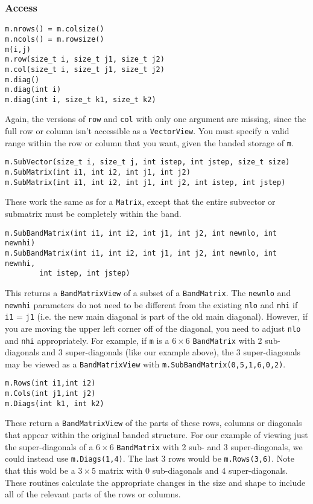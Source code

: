 \documentclass[twoside,letterpaper,11pt]{article}
\renewcommand{\tt}[1]{{\texttt {#1}}}
\begin{document}
\subsubsection{Access}

\begin{verbatim}
m.nrows() = m.colsize()
m.ncols() = m.rowsize()
m(i,j)
m.row(size_t i, size_t j1, size_t j2)
m.col(size_t i, size_t j1, size_t j2)
m.diag()
m.diag(int i)
m.diag(int i, size_t k1, size_t k2)
\end{verbatim}
Again, the versions of \tt{row} and \tt{col} with only one argument are
missing, since the full row or column isn't accessible as a \tt{VectorView}.
You must specify a valid range within the row or column that you want, 
given the banded storage of \tt{m}.

\begin{verbatim}
m.SubVector(size_t i, size_t j, int istep, int jstep, size_t size)
m.SubMatrix(int i1, int i2, int j1, int j2)
m.SubMatrix(int i1, int i2, int j1, int j2, int istep, int jstep)
\end{verbatim}
These work the same as for a \tt{Matrix}, except that the entire
subvector or submatrix must be completely within the band.

\begin{verbatim}
m.SubBandMatrix(int i1, int i2, int j1, int j2, int newnlo, int newnhi)
m.SubBandMatrix(int i1, int i2, int j1, int j2, int newnlo, int newnhi, 
        int istep, int jstep)
\end{verbatim}
This returns a \tt{BandMatrixView} of a subset of a \tt{BandMatrix}.
The \tt{newnlo} and \tt{newnhi} parameters do not need to be different
from the existing \tt{nlo} and \tt{nhi} if \tt{i1} = \tt{j1} 
(i.e. the new main diagonal
is part of the old main diagonal).  However, if you are moving the upper left
corner off of the diagonal, you need to adjust \tt{nlo} and \tt{nhi} appropriately.
For example, if \tt{m} is a $6 \times 6$ \tt{BandMatrix} with 2 sub-diagonals and 
3 super-diagonals
(like our example above), the 3 super-diagonals may be viewed as a \tt{BandMatrixView}
with \tt{m.SubBandMatrix(0,5,1,6,0,2)}.

\begin{verbatim}
m.Rows(int i1,int i2)
m.Cols(int j1,int j2)
m.Diags(int k1, int k2)
\end{verbatim}
These return a \tt{BandMatrixView} of the parts of these rows,
columns or diagonals that
appear within the original banded structure.  For our example of viewing just
the super-diagonals of a $6 \times 6$ \tt{BandMatrix} with 2 sub- and 
3 super-diagonals, we
could instead use \tt{m.Diags(1,4)}.  The last 3 rows would be \tt{m.Rows(3,6)}.
Note that this wold be a $3 \times 5$ matrix with 0 sub-diagonals and 
4 super-diagonals.
These routines calculate the appropriate changes in the size and shape to include
all of the relevant parts of the rows or columns.
\end{document}
